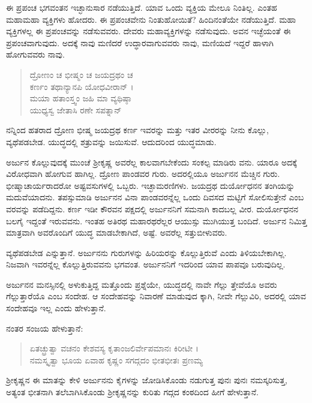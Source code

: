 ಈ ಪ್ರಪಂಚ ಭಗವಂತನ ಇಚ್ಛಾನುಸಾರ ನಡೆಯುತ್ತಿದೆ. ಯಾವ ಒಂದು ವ್ಯಕ್ತಿಯ ಮೇಲೂ ನಿಂತಿಲ್ಲ. ಎಂತಹ ಮಹಾಮಹಾ ವ್ಯಕ್ತಿಗಳು ಹೋದರು. ಈ ಪ್ರಪಂಚವೇನು ನಿಂತುಹೋಯಿತೆ? ಹಿಂದಿನಂತೆಯೇ ನಡೆಯುತ್ತಿದೆ. ಮಹಾ ವ್ಯಕ್ತಿಗಳಲ್ಲ ಈ ಪ್ರಪಂಚವನ್ನು ನಡೆಸುವವರು. ದೇವರು ಮಹಾವ್ಯಕ್ತಿಗಳನ್ನು ನಡೆಸುವುದು. ಅವನ ಇಚ್ಛೆಯಂತೆ ಈ ಪ್ರಪಂಚವಾಗುವುದು. ಅದಕ್ಕೆ ನಾವು ಮಣಿದರೆ ಉದ್ಧಾರವಾಗುವವರು ನಾವು, ಮಣಿಯದೆ ಇದ್ದರೆ ಹಾಳಾಗಿ ಹೋಗುವವರು ನಾವು.

\begin{verse}
ದ್ರೋಣಂ ಚ ಭೀಷ್ಮಂ ಚ ಜಯದ್ರಥಂ ಚ \\ ಕರ್ಣಂ ತಥಾನ್ಯಾನಪಿ ಯೋಧವೀರಾನ್ ।\\ಮಯಾ ಹತಾಂಸ್ತ್ವಂ ಜಹಿ ಮಾ ವ್ಯಥಿಷ್ಠಾ \\ ಯುಧ್ಯಸ್ವ ಜೇತಾಸಿ ರಣೇ ಸಪತ್ನಾನ್ 
\end{verse}

{\small ನನ್ನಿಂದ ಹತರಾದ ದ್ರೋಣ ಭೀಷ್ಮ ಜಯದ್ರಥ ಕರ್ಣ ಇವರನ್ನು ಮತ್ತು ಇತರ ವೀರರನ್ನು ನೀನು ಕೊಲ್ಲು, ವ್ಯಥೆಪಡಬೇಡ. ಯುದ್ಧದಲ್ಲಿ ಶತ್ರುವನ್ನು ಜಯಿಸುವೆ. ಆದುದರಿಂದ ಯುದ್ಧಮಾಡು.}

ಅರ್ಜುನ ಕೊಲ್ಲುವುದಕ್ಕೆ ಮುಂಚೆ ಶ್ರೀಕೃಷ್ಣ ಅವರೆಲ್ಲ ಕಾಲವಾಗಬೇಕೆಂದು ಸಂಕಲ್ಪ ಮಾಡಿರು ವನು. ಯಾರೂ ಅದಕ್ಕೆ ವಿರೋಧವಾಗಿ ಹೋಗುವ ಹಾಗಿಲ್ಲ. ದ್ರೋಣ ಪಾಂಡವರ ಗುರು. ಅದರಲ್ಲಿಯೂ ಅರ್ಜುನನ ಮೆಚ್ಚಿನ ಗುರು. ಭೀಷ್ಮಾಚಾರ್ಯರಾದರೋ ಅಷ್ಟವಸುಗಳಲ್ಲಿ ಒಬ್ಬರು. ಇಚ್ಛಾಮರಣಿಗಳು. ಜಯದ್ರಥ ದುರ್ಯೋಧನನ ತಂಗಿಯನ್ನು ಮದುವೆಯಾದನು. ತಪಸ್ಸುಮಾಡಿ ಅರ್ಜುನನ ವಿನಾ ಪಾಂಡವರನ್ನೆಲ್ಲ ಒಂದು ದಿವಸದ ಮಟ್ಟಿಗೆ ಸೋಲಿಸುತ್ತೇನೆ ಎಂಬ ವರವನ್ನು ಪಡೆದಿದ್ದನು. ಕರ್ಣ ಇಡೀ ಕೌರವನ ಪಕ್ಷದಲ್ಲಿ ಅರ್ಜುನನಿಗೆ ಸಮನಾಗಿ ಕಾದಬಲ್ಲ ವೀರ. ದುರ್ಯೋಧನನ ಬಲಗೈ ಇದ್ದಂತೆ ಇರುವವನು. ಇಂತಹ ಅತಿರಥ ಮಹಾರಥರೆಲ್ಲರ ಆಯುಸ್ಸು ಮುಗಿಯುತ್ತ ಬಂದಿದೆ. ಅರ್ಜುನ ನಿಮಿತ್ತ ಮಾತ್ರವಾಗಿ ಅವರೊಂದಿಗೆ ಯುದ್ಧ ಮಾಡಬೇಕಾಗಿದೆ, ಅಷ್ಟೆ. ಅವರೆಲ್ಲ ಸತ್ತುಬೀಳುವರು.

ವ್ಯಥೆಪಡಬೇಡ ಎನ್ನುತ್ತಾನೆ. ಅರ್ಜುನನು ಗುರುಗಳನ್ನು ಹಿರಿಯರನ್ನು ಕೊಲ್ಲುತ್ತಿರುವೆ ಎಂದು ತಿಳಿಯಬೇಕಾಗಿಲ್ಲ. ನಿಜವಾಗಿ ಇವರನ್ನೆಲ್ಲ ಕೊಲ್ಲುತ್ತಿರುವವನು ಭಗವಂತ. ಅರ್ಜುನನಿಗೆ ಇದರಿಂದ ಯಾವ ಪಾಪವೂ ಬರುವುದಿಲ್ಲ.

ಅರ್ಜುನನ ಮನಸ್ಸಿನಲ್ಲಿ ಅಳುಕುತ್ತಿದ್ದ ಮತ್ತೊಂದು ಪ್ರಶ್ನೆಯೇ, ಯುದ್ಧದಲ್ಲಿ ನಾವೇ ಗೆಲ್ಲು ತ್ತೇವೆಯೊ ಅವರು ಗೆಲ್ಲುತ್ತಾರೆಯೊ ಎಂಬ ಸಂದೇಹ. ಆ ಸಂದೇಹವನ್ನು ನಿವಾರಣೆ ಮಾಡುವುದ ಕ್ಕಾಗಿ, ನೀವೇ ಗೆಲ್ಲುವಿರಿ, ಅದರಲ್ಲಿ ಯಾವ ಸಂದೇಹವೂ ಇಲ್ಲ ಎಂದು ಹೇಳುತ್ತಾನೆ.

ನಂತರ ಸಂಜಯ ಹೇಳುತ್ತಾನೆ:

\begin{verse}
ಏತಚ್ಛ್ರುತ್ವಾ ವಚನಂ ಕೇಶವಸ್ಯ ಕೃತಾಂಜಲಿರ್ವೇಪಮಾನಃ ಕಿರೀಟೀ ।\\ನಮಸ್ಕೃತ್ವಾ ಭೂಯ ಏವಾಹ ಕೃಷ್ಣಂ ಸಗದ್ಗದಂ ಭೀತಭೀತಃ ಪ್ರಣಮ್ಯ 
\end{verse}

{\small ಶ್ರೀಕೃಷ್ಣನ ಈ ಮಾತನ್ನು ಕೇಳಿ ಅರ್ಜುನನು ಕೈಗಳನ್ನು ಜೋಡಿಸಿಕೊಂಡು ನಡುಗುತ್ತ ಪುನಃ ಪುನಃ ನಮಸ್ಕರಿಸುತ್ತ, ಅತ್ಯಂತ ಭೀತನಾಗಿ ತಲೆಬಾಗಿಸಿಕೊಂಡು ಶ್ರೀಕೃಷ್ಣನನ್ನು ಕುರಿತು ಗದ್ಗದ ಕಂಠದಿಂದ ಹೀಗೆ ಹೇಳುತ್ತಾನೆ.}


